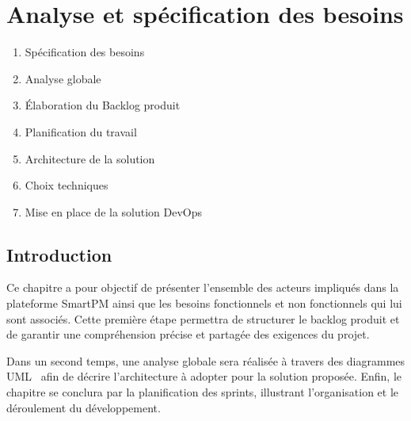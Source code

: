 \chapter{Analyse et spécification des besoins}

\vspace{-0.5cm}
\begin{tcolorbox}[colback=lightgray, colframe=primaryblue, title=\textbf{Plan du chapitre}, fonttitle=\bfseries]
  \begin{enumerate}[leftmargin=*, label=\arabic*.]
    \item Spécification des besoins \dotfill \pageref{sec:besoins}
    \item Analyse globale \dotfill \pageref{sec:analyse_globale}
    \item Élaboration du Backlog produit \dotfill \pageref{sec:backlog}
    \item Planification du travail \dotfill \pageref{sec:planification}
    \item Architecture de la solution \dotfill \pageref{sec:architecture}
    \item Choix techniques \dotfill \pageref{sec:choix_techniques}
    \item Mise en place de la solution DevOps \dotfill \pageref{sec:devops}
  \end{enumerate}
\end{tcolorbox}

\section*{Introduction}

Ce chapitre a pour objectif de présenter l'ensemble des acteurs impliqués dans la plateforme
SmartPM ainsi que les besoins fonctionnels et non fonctionnels qui lui sont associés. Cette
première étape permettra de structurer le backlog produit et de garantir une compréhension
précise et partagée des exigences du projet.

Dans un second temps, une analyse globale sera réalisée à travers des diagrammes UML~\cite{uml} afin
de décrire l'architecture à adopter pour la solution proposée. Enfin, le chapitre se conclura
par la planification des sprints, illustrant l'organisation et le déroulement du développement.


